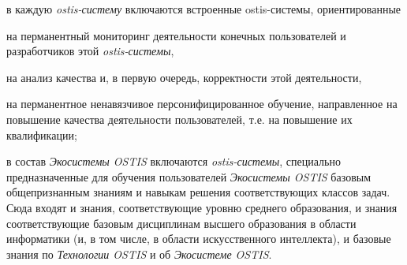 \begin{SCn}
\begin{scnsubstruct}
{            \begin{scnitemize}
                \item в каждую \textit{ostis-систему} включаются встроенные ostis-системы, ориентированные
                \begin{scnitemizeii}
                    \item на перманентный мониторинг деятельности конечных пользователей и разработчиков этой \textit{\mbox{ostis-системы}},
                    \item на анализ качества и, в первую очередь, корректности этой деятельности,
                    \item на перманентное ненавязчивое персонифицированное обучение, направленное на повышение качества деятельности пользователей, т.е. на повышение их квалификации;
                \end{scnitemizeii}
                \item в состав \textit{Экосистемы OSTIS} включаются \textit{ostis-системы}, специально предназначенные для обучения пользователей \textit{Экосистемы OSTIS} базовым общепризнанным знаниям и навыкам решения соответствующих классов задач. Сюда входят и знания, соответствующие уровню среднего образования, и знания соответствующие базовым дисциплинам высшего образования в области информатики (и, в том числе, в области искусственного интеллекта), и базовые знания по \textit{Технологии OSTIS} и об \textit{Экосистеме OSTIS}.
            \end{scnitemize}
        }

\end{scnsubstruct}
\end{SCn}
